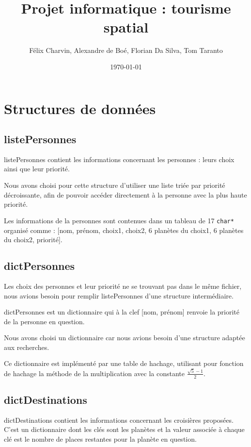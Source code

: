 \documentclass[a4paper, 11pt]{article}
\begin{document}
\title{Projet informatique : tourisme spatial}
\author{Félix Charvin, Alexandre de Boé, Florian Da Silva, Tom Taranto}
\date{\today}

\maketitle

\section{Structures de données}

\subsection{listePersonnes}
listePersonnes contient les informations concernant les personnes : leurs choix ainsi que leur priorité.

Nous avons choisi pour cette structure d'utiliser une liste triée par priorité décroissante, afin de pouvoir accéder directement à la personne avec la plus haute priorité.

Les informations de la personnes sont contenues dans un tableau de 17 \texttt{char*} organisé comme : [nom, prénom, choix1, choix2, 6 planètes du choix1, 6 planètes du choix2, priorité].


\subsection{dictPersonnes}
Les choix des personnes et leur priorité ne se trouvant pas dans le même fichier, nous avions besoin pour remplir listePersonnes d'une structure intermédiaire.

dictPersonnes est un dictionnaire qui à la clef [nom, prénom] renvoie la priorité de la personne en question.

Nous avons choisi un dictionnaire car nous avions besoin d'une structure adaptée aux recherches.

Ce dictionnaire est implémenté par une table de hachage, utilisant pour fonction de hachage la méthode de la multiplication avec la constante $\frac{\sqrt{5}-1}{2}$.

\subsection{dictDestinations}
dictDestinations contient les informations concernant les croisières proposées. C'est un dictionnaire dont les clés sont les planètes et la valeur associée à chaque clé est le nombre de places restantes pour la planète en question.
\end{document}
